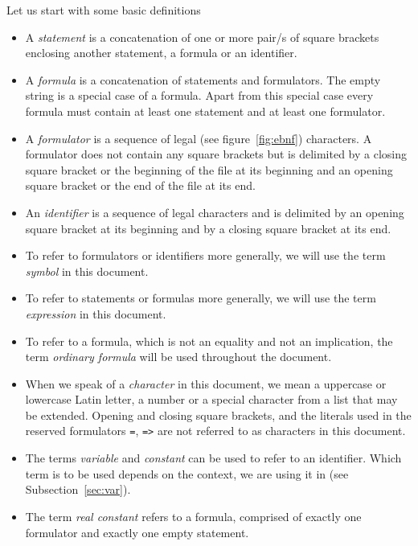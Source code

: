 \documentclass[british]{article}
\newcommand\prv{bc}
\newcommand\m[1]{\texttt{#1}}
\begin{document}
Let us start with some basic definitions
\begin{itemize}
	\item
		A \emph{statement} is a concatenation of one or more pair/s of square
		brackets enclosing another statement, a formula or an identifier.
	\item
		A \emph{formula} is a concatenation of statements and formulators.
		The empty string is a special case of a formula. Apart from this special
		case every formula must contain at least one statement and at least
		one formulator.
	\item
		A \emph{formulator }is a sequence of legal (see figure~\ref{fig:ebnf})
		characters. A formulator does not contain any square brackets but
		is delimited by a closing square bracket or the beginning of the file
		at its beginning and an opening square bracket or the end of the file
		at its end.
	\item An \emph{identifier} is a sequence of legal characters and is
		delimited by an opening square bracket at its beginning and by a closing
		square bracket at its end.
	\item
		To refer to formulators or identifiers more generally, we will use
		the term \emph{symbol }in this document.
	\item
		To refer to statements or formulas more generally, we will use the
		term \emph{expression }in this document.
	\item
		To refer to a formula, which is not an equality and not an implication,
		the term \emph{ordinary formula} will be used throughout the document.
	\item
		When we speak of a \emph{character} in this document, we mean a
		uppercase or lowercase Latin letter, a number or a special character
		from a list that may be extended. Opening and closing square brackets,
		and the literals used in the reserved formulators \m{=}, \m{=>}
		are not referred to as characters in this document.
	\item
		The terms \emph{variable} and \emph{constant} can be used to refer
		to an identifier. Which term is to be used depends on the context,
		we are using it in (see Subsection~\ref{sec:var}).
	\item
		The term \emph{real constant} refers to a formula, comprised of exactly
		one formulator and exactly one empty statement.
\end{itemize}
\end{document}
